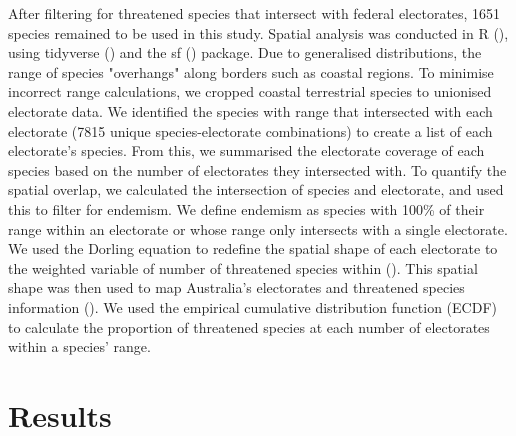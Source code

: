 \documentclass[a4paper,11pt]{article}
\begin{document}
After filtering for threatened species that intersect with federal electorates, 1651 species remained to be used in this study. Spatial analysis was conducted in R (\cite{rcoreteamLanguageEnvironmentStatistical2021}), using tidyverse (\cite{wickhamWelcomeTidyverse2019}) and the sf (\cite{pebesmaSimpleFeaturesStandardized2018}) package. Due to generalised distributions, the range of species "overhangs" along borders such as coastal regions. To minimise incorrect range calculations, we cropped coastal terrestrial species to unionised electorate data. We identified the species with range that intersected with each electorate (7815 unique species-electorate combinations) to create a list of each electorate's species. From this, we summarised the electorate coverage of each species based on the number of electorates they intersected with. To quantify the spatial overlap, we calculated the intersection of species and electorate, and used this to filter for endemism. We define endemism as species with 100\% of their range within an electorate or whose range only intersects with a single electorate. We used the Dorling equation to redefine the spatial shape of each electorate to the weighted variable of number of threatened species within (\cite{jeworutzkiCartogramCreateCartograms2020}). This spatial shape was then used to map Australia's electorates and threatened species information (\cite{hahnTmapMakingMaps}). We used the empirical cumulative distribution function (ECDF) to calculate the proportion of threatened species at each number of electorates within a species' range.

\section{Results}
\end{document}
